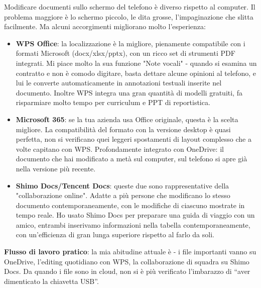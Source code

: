 


Modificare documenti sullo schermo del telefono è diverso rispetto al computer. Il problema maggiore è lo schermo piccolo, le dita grosse, l'impaginazione che slitta facilmente. Ma alcuni accorgimenti migliorano molto l'esperienza:

\begin{itemize}
  \item \textbf{WPS Office}: la localizzazione è la migliore, pienamente compatibile con i formati Microsoft (docx/xlsx/pptx), con un ricco set di strumenti PDF integrati. Mi piace molto la sua funzione "Note vocali" - quando si esamina un contratto e non è comodo digitare, basta dettare alcune opinioni al telefono, e lui le converte automaticamente in annotazioni testuali inserite nel documento. Inoltre WPS integra una gran quantità di modelli gratuiti, fa risparmiare molto tempo per curriculum e PPT di reportistica.
  \item \textbf{Microsoft 365}: se la tua azienda usa Office originale, questa è la scelta migliore. La compatibilità del formato con la versione desktop è quasi perfetta, non si verificano quei leggeri spostamenti di layout complesso che a volte capitano con WPS. Profondamente integrato con OneDrive: il documento che hai modificato a metà sul computer, sul telefono si apre già nella versione più recente.
  \item \textbf{Shimo Docs/Tencent Docs}: queste due sono rappresentative della "collaborazione online". Adatte a più persone che modificano lo stesso documento contemporaneamente, con le modifiche di ciascuno mostrate in tempo reale. Ho usato Shimo Docs per preparare una guida di viaggio con un amico, entrambi inserivamo informazioni nella tabella contemporaneamente, con un'efficienza di gran lunga superiore rispetto al farlo da soli.
\end{itemize}

\textbf{Flusso di lavoro pratico}: la mia abitudine attuale è - i file importanti vanno su OneDrive, l'editing quotidiano con WPS, la collaborazione di squadra su Shimo Docs. Da quando i file sono in cloud, non si è più verificato l'imbarazzo di “aver dimenticato la chiavetta USB”.

